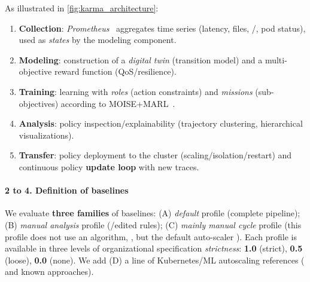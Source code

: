 As illustrated in \autoref{fig:karma_architecture}:
\begin{enumerate}[label=\textbf{\arabic*)}, leftmargin=3.5mm, itemsep=2pt, topsep=2pt]
  \item \textbf{Collection}: \textit{Prometheus}~\cite{prometheus} aggregates time series (latency, files, /, pod status), used as \emph {states} by the modeling component.
  \item \textbf{Modeling}: construction of a \emph{digital twin} (transition model) and a multi-objective reward function (QoS/resilience).
  \item \textbf{Training}:  learning with \textit{roles} (action constraints) and \textit{missions} (sub-objectives) according to MOISE+MARL~\cite{soule2024aomea}.
  \item \textbf{Analysis}: policy inspection/explainability (trajectory clustering, hierarchical visualizations).
  \item \textbf{Transfer}: policy deployment to the cluster (scaling/isolation/restart) and continuous policy \textbf{update loop} with new traces.
\end{enumerate}


\paragraph{2 to 4. Definition of baselines}

We evaluate \textbf{three families} of baselines: (A) \emph{default} profile (complete  pipeline); (B) \emph{manual analysis} profile (/edited rules); (C) \emph{mainly manual cycle} profile (this profile does not use an algorithm, , but the default auto-scaler ). Each profile is available in three levels of organizational specification \emph{strictness}: \textbf{1.0} (strict), \textbf{0.5} (loose), \textbf{0.0} (none). We add (D) a line of Kubernetes/ML autoscaling references ( and known  approaches).



